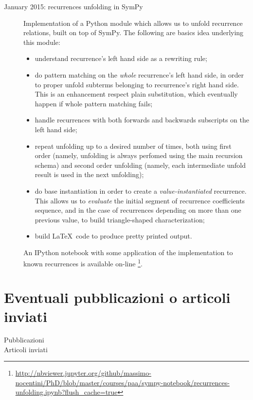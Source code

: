\documentclass[11pt]{article}
\begin{document}
\begin{description}

\item[January 2015: recurrences unfolding in SymPy] 
    Implementation of a Python module which allows us to unfold
    recurrence relations, built on top of SymPy. The following are basics idea underlying
    this module:
    \begin{itemize}
        \item understand recurrence's left hand side as a rewriting rule;
        \item do pattern matching on the \emph{whole} recurrence's left hand side,
            in order to proper unfold subterms belonging to recurrence's right hand
            side. This is an enhancement respect plain substitution, which eventually
            happen if whole pattern matching fails; 
        \item handle recurrences with both forwards and backwards subscripts on the
            left hand side;
        \item repeat unfolding up to a desired number of times, both using first order
            (namely, unfolding is always perfomed using the main recursion schema)
            and second order unfolding (namely, each intermediate unfold result is used
            in the next unfolding);
        \item do base instantiation in order to create a \emph{value-instantiated}
            recurrence. This allows us to \emph{evaluate} the initial segment of
            recurrence coefficients sequence, and in the case of recurrences
            depending on more than one previous value, to build triangle-shaped characterization;
        \item build \LaTeX\, code to produce pretty printed output.
    \end{itemize}
    An IPython notebook with some application of the implementation to known recurrences is available on-line 
    \footnote{\url{http://nbviewer.jupyter.org/github/massimo-nocentini/PhD/blob/master/courses/paa/sympy-notebook/recurrences-unfolding.ipynb?flush_cache=true}}.

\end{description}


\section*{Eventuali pubblicazioni o articoli inviati}

\begin{description}


\item[Pubblicazioni] 


\item[Articoli inviati]





\end{description}
\end{document}
